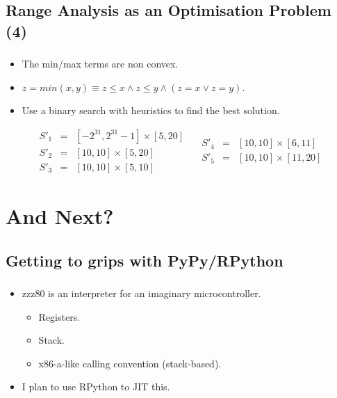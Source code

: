 \documentclass[compress]{beamer}
\begin{document}
\subsection{Range Analysis as an Optimisation Problem (4)}
\begin{frame}[fragile]
	\frametitle{\insertsubsection}

\begin{itemize}
\item The min/max terms are non convex.
\vfill
\item $z = min(x, y) \equiv z \leq x \wedge z \leq y \wedge (z = x \vee z = y)$.
\vfill
\item Use a binary search with heuristics to find the best solution.
\end{itemize}

\vfill

\[
\begin{array}{rcl}
S'_1 & = & [-2^{31}, 2^{31} - 1] \times [5, 20] \\
S'_2 & = & [10, 10] \times [5, 20] \\
S'_3 & = & [10, 10] \times [5, 10]
\end{array}
\quad
\begin{array}{rcl}
S'_4 & = & [10, 10] \times [6, 11] \\
S'_5 & = & [10, 10] \times [11, 20]
\end{array}
\]

\end{frame}

\section{And Next?}

\begin{frame}
  \sectionpage
\end{frame}


\subsection{Getting to grips with PyPy/RPython}
\begin{frame}[fragile]
	\frametitle{\insertsubsection}

	\begin{itemize}
	\item zzz80 is an interpreter for an imaginary microcontroller.
		\begin{itemize}
			\item Registers.
			\item Stack.
			\item x86-a-like calling convention (stack-based).
		\end{itemize}
		\vfill
	\item I plan to use RPython to JIT this.
	\end{itemize}
\end{frame}
\end{document}
